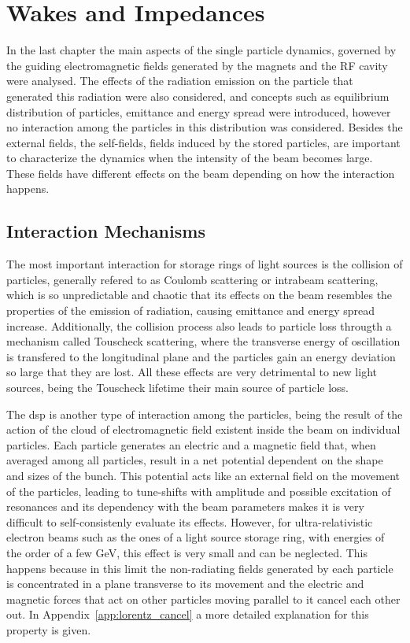 \documentclass[
	12pt,				%
	openright,			%
	oneside,			%
	a4paper,		%
	chapter=TITLE,		%
	section=TITLE,		%
    brazil,				%
	english,			%
	sumario=tradicional,
	]{abntex2}
\begin{document}
\chapter{Wakes and Impedances}\label{cap:wake_impedances}

In the last chapter the main aspects of the single particle dynamics, governed by the guiding electromagnetic fields generated by the magnets and the RF cavity were analysed. The effects of the radiation emission on the particle that generated this radiation were also considered, and concepts such as equilibrium distribution of particles, emittance and energy spread were introduced, however no interaction among the particles in this distribution was considered. Besides the external fields, the self-fields, fields induced by the stored particles, are important to characterize the dynamics when the intensity of the beam becomes large. These fields have different effects on the beam depending on how the interaction happens.

  \section{Interaction Mechanisms}

  The most important interaction for storage rings of light sources is the collision of particles, generally refered to as Coulomb scattering or intrabeam scattering, which is so unpredictable and chaotic that its effects on the beam resembles the properties of the emission of radiation, causing emittance and energy spread increase. Additionally, the collision process also leads to particle loss througth a mechanism called Touscheck scattering, where the transverse energy of oscillation is transfered to the longitudinal plane and the particles gain an energy deviation so large that they are lost. All these effects are very detrimental to new light sources, being the Touscheck lifetime their main source of particle loss.

  The \gls{dsp} is another type of interaction among the particles, being the result of the action of the cloud of electromagnetic field existent inside the beam on individual particles. Each particle generates an electric and a magnetic field that, when averaged among all particles, result in a net potential dependent on the shape and sizes of the bunch. This potential acts like an external field on the movement of the particles, leading to tune-shifts with amplitude and possible excitation of resonances and its dependency with the beam parameters makes it is very difficult to self-consistenly evaluate its effects. However, for ultra-relativistic electron beams such as the ones of a light source storage ring, with energies of the order of a few \si{\giga\electronvolt}, this effect is very small and can be neglected. This happens because in this limit the non-radiating fields generated by each particle is concentrated in a plane transverse to its movement and the electric and magnetic forces that act on other particles moving parallel to it cancel each other out. In Appendix~\ref{app:lorentz_cancel} a more detailed explanation for this property is given.
\end{document}
